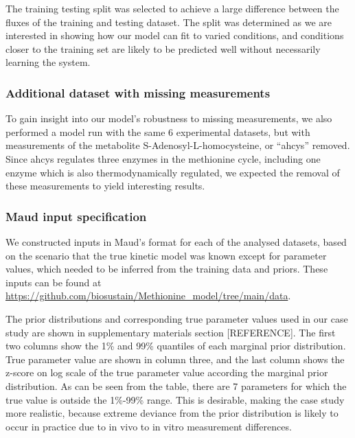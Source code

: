 \documentclass[journal=,manuscript=]{achemso}
\begin{document}
The training testing split was selected to achieve a large difference
between the fluxes of the training and testing dataset. The split was
determined as we are interested in showing how our model can fit to
varied conditions, and conditions closer to the training set are likely
to be predicted well without necessarily learning the system.

\hypertarget{additional-dataset-with-missing-measurements}{%
\subsubsection{Additional dataset with missing
measurements}\label{additional-dataset-with-missing-measurements}}

To gain insight into our model's robustness to missing measurements, we
also performed a model run with the same 6 experimental datasets, but
with measurements of the metabolite S-Adenosyl-L-homocysteine, or
``ahcys'' removed. Since ahcys regulates three enzymes in the methionine
cycle, including one enzyme which is also thermodynamically regulated,
we expected the removal of these measurements to yield interesting
results.

\hypertarget{maud-input-specification}{%
\subsubsection{Maud input
specification}\label{maud-input-specification}}

We constructed inputs in Maud's format for each of the analysed
datasets, based on the scenario that the true kinetic model was known
except for parameter values, which needed to be inferred from the
training data and priors. These inputs can be found at
\url{https://github.com/biosustain/Methionine_model/tree/main/data}.

The prior distributions and corresponding true parameter values used in
our case study are shown in supplementary materials section
{[}REFERENCE{]}. The first two columns show the 1\% and 99\% quantiles
of each marginal prior distribution. True parameter value are shown in
column three, and the last column shows the z-score on log scale of the
true parameter value according the marginal prior distribution. As can
be seen from the table, there are 7 parameters for which the true value
is outside the 1\%-99\% range. This is desirable, making the case study
more realistic, because extreme deviance from the prior distribution is
likely to occur in practice due to in vivo to in vitro measurement
differences.
\end{document}
